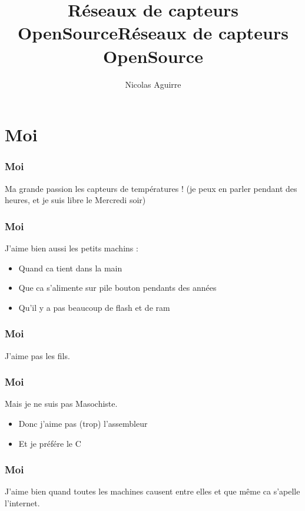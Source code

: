 \documentclass{smilebeamer}
\title{Réseaux de capteurs OpenSource}
\author{Nicolas Aguirre}
\begin{document}
\begin{frame}[plain]
  \title{Réseaux de capteurs OpenSource}
    \titlepage
\end{frame}

\section{Moi}



\begin{frame}
\frametitle{Moi}
\begin{center}
Ma grande passion les capteurs de températures !
\newline 
(je peux en parler pendant des heures, et je suis libre le Mercredi soir)
\end{center}


\end{frame}

\begin{frame}
\frametitle{Moi}
J'aime bien aussi les petits machins :

\begin{itemize}
\item Quand ca tient dans la main
\item Que ca s'alimente sur pile bouton pendants des années
\item Qu'il y a pas beaucoup de flash et de ram
\end{itemize}
\end{frame}

\begin{frame}
\frametitle{Moi}
\begin{center}
J'aime pas les fils.
\end{center}
\end{frame}

\begin{frame}
\frametitle{Moi}
Mais je ne suis pas Masochiste.
\begin{itemize}
\item Donc j'aime pas (trop) l'assembleur
\item Et je préfére le C
\end{itemize}
\end{frame}

\begin{frame}
\frametitle{Moi}
J'aime bien quand toutes les machines causent entre elles et que même ca s'apelle l'internet.
\end{frame}
\end{document}
